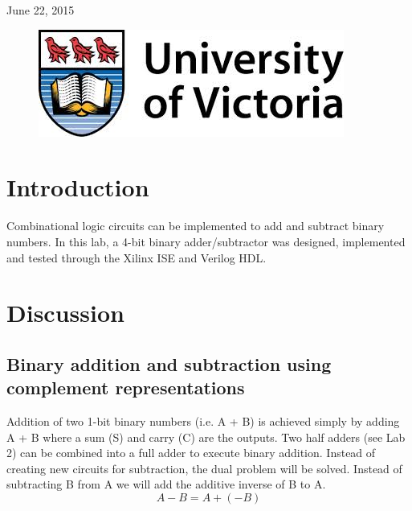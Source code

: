 \documentclass[11pt]{article}
\begin{document}
\begin{titlepage}
{\large June 22, 2015}\\ %

\begin{figure}[b]	 %
	\centering
	\includegraphics[scale=0.3]{UVic_logo}
\end{figure}

\end{titlepage}


\section{Introduction}

Combinational logic circuits can be implemented to add and subtract binary numbers. In this lab, a 4-bit binary adder/subtractor was designed, implemented and tested through the Xilinx ISE and Verilog HDL.  

\section{Discussion}

\subsection{Binary addition and subtraction using complement representations}

Addition of two 1-bit binary numbers (i.e. A + B) is achieved simply by adding A + B where a sum (S) and carry (C) are the outputs. Two half adders (see Lab 2) can be combined into a full adder to execute binary addition. Instead of creating new circuits for subtraction, the dual problem will be solved. Instead of subtracting B from A we will add the additive inverse of B to A.
\begin{equation*}
A - B = A + (-B)
\end{equation*}
\end{document}
